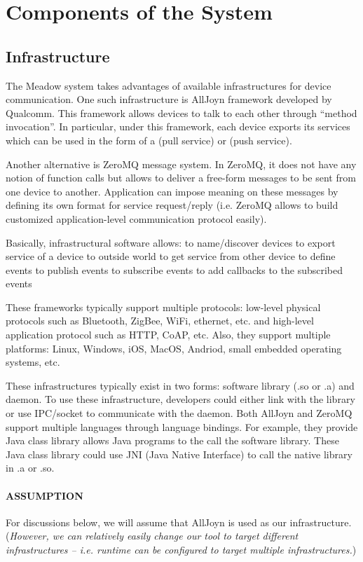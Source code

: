 \documentclass{note}
\begin{document}
\section{Components of the System}

\subsection{Infrastructure}
The Meadow system takes advantages of available infrastructures for device
communication. One such infrastructure is AllJoyn framework developed by
Qualcomm.  This framework allows devices to talk to each other through ``method
invocation''. In particular, under this framework, each device exports its
services which can be used in the form of a  (pull service) or
   (push service). 

  Another alternative
is ZeroMQ message system. In ZeroMQ, it does not have any notion of function
calls but allows to deliver a free-form messages to be sent from one device to
another. Application can impose meaning on these messages by defining its own
format for service request/reply (i.e. ZeroMQ allows to build customized
application-level communication protocol easily). 

Basically, infrastructural software allows:
\bit
\w to name/discover devices
\w to export service of a device to outside world
\w to get service from other device
\w to define events
\w to publish events
\w to subscribe events
\w to add callbacks to the subscribed events
\eit

These frameworks typically support multiple protocols: low-level physical
protocols such as Bluetooth, ZigBee, WiFi, ethernet, etc. and high-level
application protocol such as HTTP, CoAP, etc.
Also, they support multiple platforms: Linux, Windows, iOS, MacOS, Andriod,
small embedded operating systems, etc. 

These infrastructures typically exist in two forms: software library (.so or
.a) and daemon. To use these infrastructure, developers could either link with
the library or use IPC/socket to communicate with the daemon.
Both AllJoyn and ZeroMQ support multiple languages through language
bindings. For example, they provide Java class library allows Java programs to
the call the software library. These Java class library could use JNI (Java
Native Interface) to call the native library in .a or .so. 

\paragraph{ASSUMPTION} For discussions below, we will assume that AllJoyn is
used as our infrastructure. ({\em However, we can relatively easily change our
  tool to target different infrastructures -- i.e. runtime can be configured
  to target multiple infrastructures.})
\end{document}
